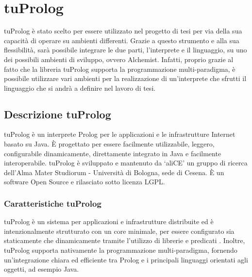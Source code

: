 \chapter{tuProlog}
\lhead[\fancyplain{}{\bfseries\thepage}]{\fancyplain{}{\bfseries\rightmark}}

tuProlog è stato scelto per essere utilizzato nel progetto di tesi per via della sua capacità di operare su ambienti differenti. Grazie a questo strumento e alla sua flessibilità, sarà possibile integrare le due parti, l'interprete e il linguaggio, su uno dei possibili ambienti di sviluppo, ovvero Alchemist. Infatti, proprio grazie al fatto che la libreria tuProlog supporta la programmazione multi-paradigma, è possibile utilizzare vari ambienti per la realizzazione di un'interprete che sfrutti il linguaggio che si andrà a definire nel lavoro di tesi.

\section{Descrizione tuProlog}
tuProlog è un interprete Prolog per le applicazioni e le infrastrutture Internet basato su Java. \`E progettato per essere facilmente utilizzabile, leggero, configurabile dinamicamente, direttamente integrato in Java e facilmente interoperabile.
tuProlog è sviluppato e mantenuto da `aliCE' un gruppo di ricerca dell'Alma Mater Studiorum - Università di Bologna, sede di Cesena. \`E un software Open Source e rilasciato sotto licenza LGPL.

\subsection{Caratteristiche tuProlog}
tuProlog è un sistema per applicazioni e infrastrutture distribuite ed è intenzionalmente strutturato con un core minimale, per essere configurato sia staticamente che dinamicamente tramite l'utilizzo di librerie e predicati \cite{tuProlog}. Inoltre, tuProlog supporta nativamente la programmazione multi-paradigma, fornendo un'integrazione chiara ed efficiente tra Prolog e i principali linguaggi orientati agli oggetti, ad esempio Java.

